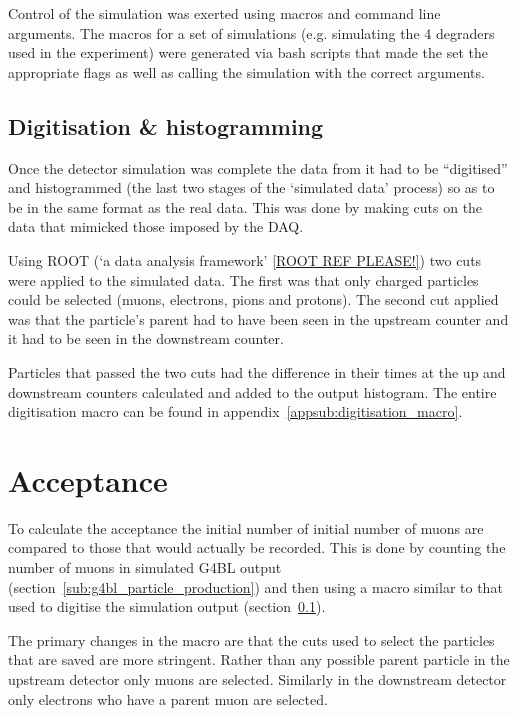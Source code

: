 \documentclass[]{article}
\begin{document}
Control of the simulation was exerted using macros and command line arguments. The macros for a set of simulations (e.g. simulating the 4 degraders used in the experiment) were generated via bash scripts that made the set the appropriate flags as well as calling the simulation with the correct arguments.
\subsection{Digitisation \& histogramming} %
\label{sub:digitisation_histogramming}
Once the detector simulation was complete the data from it had to be ``digitised'' and histogrammed (the last two stages of the `simulated data' process) so as to be in the same format as the real data. This was done by making cuts on the data that mimicked those imposed by the DAQ. 

Using ROOT (`a data analysis framework' \ref{ROOT REF PLEASE!}) two cuts were applied to the simulated data. The first was that only charged particles could be selected (muons, electrons, pions and protons). The second cut applied was that the particle's parent had to have been seen in the upstream counter and it had to be seen in the downstream counter. 

Particles that passed the two cuts had the difference in their times at the up and downstream counters calculated and added to the output histogram. The entire digitisation macro can be found in appendix~\ref{appsub:digitisation_macro}.
\section{Acceptance} %
\label{sec:acceptance}
To calculate the acceptance the initial number of initial number of muons are compared to those that would actually be recorded. This is done by counting the number of muons in simulated G4BL output (section~\ref{sub:g4bl_particle_production}) and then using a macro similar to that used to digitise the simulation output (section~\ref{sub:digitisation_histogramming}).

The primary changes in the macro are that the cuts used to select the particles that are saved are more stringent. Rather than any possible parent particle in the upstream detector only muons are selected. Similarly in the downstream detector only electrons who have a parent muon are selected.
\end{document}
